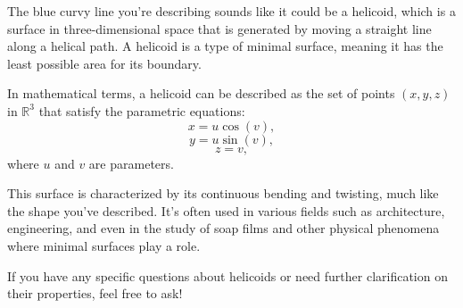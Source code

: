 The blue curvy line you're describing sounds like it could be a helicoid, which is a surface in three-dimensional space that is generated by moving a straight line along a helical path. A helicoid is a type of minimal surface, meaning it has the least possible area for its boundary.

In mathematical terms, a helicoid can be described as the set of points \((x, y, z)\) in \(\mathbb{R}^3\) that satisfy the parametric equations:
\[ x = u \cos(v), \]
\[ y = u \sin(v), \]
\[ z = v, \]
where \(u\) and \(v\) are parameters.

This surface is characterized by its continuous bending and twisting, much like the shape you've described. It's often used in various fields such as architecture, engineering, and even in the study of soap films and other physical phenomena where minimal surfaces play a role.

If you have any specific questions about helicoids or need further clarification on their properties, feel free to ask!